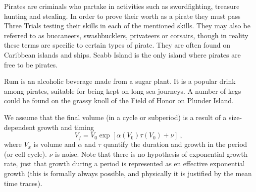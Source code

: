 \documentclass[a4paper,12pt,rmp,superscriptaddress]{revtex4}
\begin{document}
Pirates are criminals who partake in activities such as swordfighting,
treasure hunting and stealing. In order to prove their worth as a
pirate they must pass Three Trials testing their skills in each of the
mentioned skills.  They may also be referred to as buccaneers,
swashbucklers, privateers or corsairs, though in reality these terms
are specific to certain types of pirate.  They are often found on
Caribbean islands and ships.  Scabb Island is the only island where
pirates are free to be pirates.



Rum is an alcoholic beverage made from a sugar plant.  It is a popular
drink among pirates, suitable for being kept on long sea journeys. A
number of kegs could be found on the grassy knoll of the Field of
Honor on Plunder Island.



We assume that the final volume (in a cycle or subperiod) is a
result of a size-dependent growth and timing
\begin{displaymath}
  V_f = V_0 \exp \left[ \alpha(V_0)  \tau(V_0)  + \nu \right] \  ,
\end{displaymath}
where $V_x$ is volume and $\alpha$ and $\tau $ quantify the duration
and growth in the period (or cell cycle). $\nu$ is noise.  Note that
there is no hypothesis of exponential growth rate, just that growth
during a period is represented as en effective exponential growth
(this is formally always possible, and physically it is justified by
the mean time traces).
\end{document}
